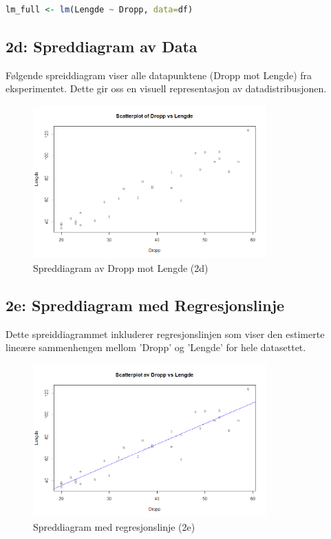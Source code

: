 \documentclass{article}
\begin{document}
\begin{lstlisting}[language=R]
lm_full <- lm(Lengde ~ Dropp, data=df)
\end{lstlisting}

\subsection{2d: Spreddiagram av Data}
Følgende spreiddiagram viser alle datapunktene (Dropp mot Lengde) fra eksperimentet. Dette gir oss en visuell representasjon av datadistribusjonen.

\begin{figure}[H]
    \centering
    \includegraphics[width=0.8\textwidth]{Rplot03.png}
    \caption{Spreddiagram av Dropp mot Lengde (2d)}
\end{figure}

\subsection{2e: Spreddiagram med Regresjonslinje}
Dette spreiddiagrammet inkluderer regresjonslinjen som viser den estimerte lineære sammenhengen mellom 'Dropp' og 'Lengde' for hele datasettet.

\begin{figure}[H]
    \centering
    \includegraphics[width=0.8\textwidth]{Rplot02.png}
    \caption{Spreddiagram med regresjonslinje (2e)}
\end{figure}
\end{document}
